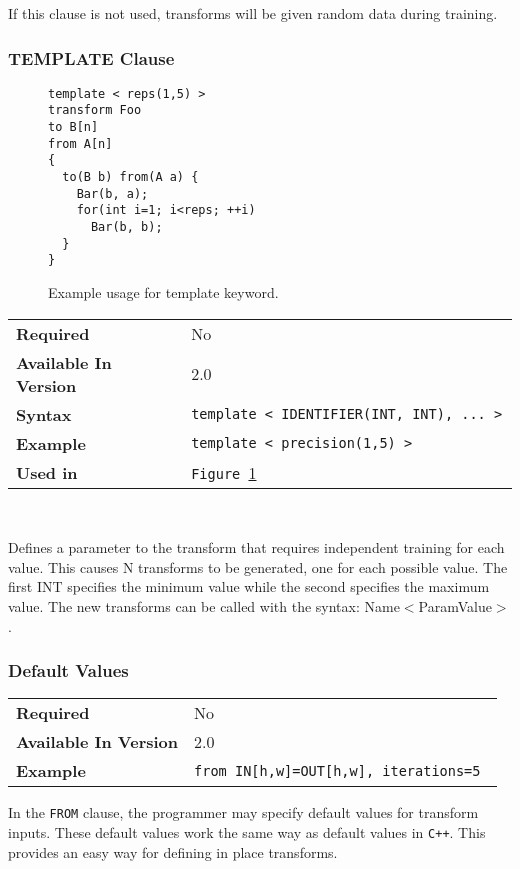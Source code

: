 \documentclass[11pt]{article}
\begin{document}
If this clause is not used, transforms will be given random data during
training.

\subsubsection{TEMPLATE Clause}

\begin{figure}[htb]
\begin{lstlisting}
template < reps(1,5) >
transform Foo
to B[n]
from A[n]
{
  to(B b) from(A a) {
    Bar(b, a);  
    for(int i=1; i<reps; ++i)
      Bar(b, b);
  }
}
\end{lstlisting}
\caption{
Example usage for template keyword.
\label{ex5}
}
\end{figure}

\begin{tabular}{| l | l |}
\hline
\bf Required & No \\
\bf Available In Version & 2.0            \\
\bf Syntax & \tt template < IDENTIFIER(INT, INT), ... > \\
\bf Example & \tt template < precision(1,5) > \\
\bf Used in & \tt Figure~\ref{ex5}      \\
\hline
\end{tabular}

~

\noindent Defines a parameter to the transform that requires independent
training for each value.  This causes N transforms to be generated, one for
each possible value.  The first INT specifies the minimum value while the
second specifies the maximum value.  The new transforms can be called with
the syntax: Name$<$ParamValue$>$.

\subsubsection{Default Values}

\begin{tabular}{| l | l |}
\hline
\bf Required & No \\
\bf Available In Version & 2.0            \\
\bf Example & \tt from IN[h,w]=OUT[h,w], iterations=5 \\
\hline
\end{tabular}

In the {\tt FROM} clause, the programmer may specify default values for transform inputs.
These default values work the same way as default values in {\tt C++}.  This provides an easy way for defining in place transforms.
\end{document}
